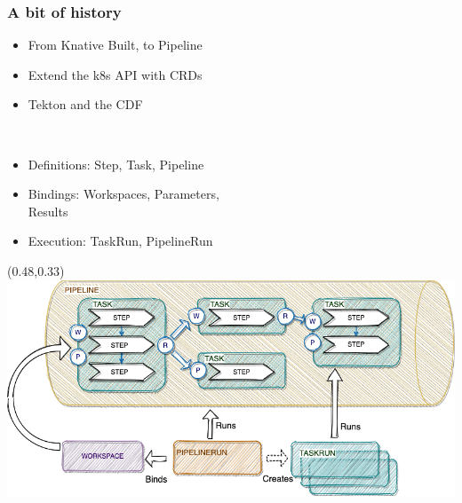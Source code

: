 \documentclass[aspectratio=169,11pt,hyperref={colorlinks=true}]{beamer}
\begin{document}
\begin{lgrayrwhiteframe}
  \frametitle{A bit of history}
  \begin{itemize}
    \item From Knative Built, to Pipeline
    \item Extend the k8s API with CRDs
    \item Tekton and the CDF
  \end{itemize}
  \vspace{0.03\paperheight}
  ~~~~~
  \vspace{0.03\paperheight}
  \begin{itemize}
    \item Definitions: Step, Task, Pipeline
    \item Bindings: Workspaces, Parameters, \\Results
    \item Execution: TaskRun, PipelineRun
  \end{itemize}
  \begin{textblock*}{0.51\paperwidth}(0.48\paperwidth,0.33\paperheight)
    \includegraphics[width=0.5\paperwidth]{img/tekton-workspaces.png}
  \end{textblock*}
\end{lgrayrwhiteframe}


\end{document}
